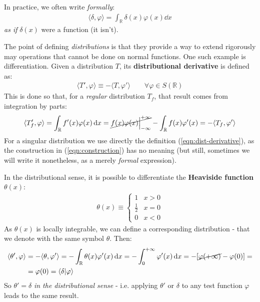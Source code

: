 \documentclass[../template.tex]{subfiles}
\begin{document}
In practice, we often write \textit{formally}:
\begin{align*}
    \langle \delta, \varphi \rangle = \int_{\mathbb{R}} \delta(x) \varphi(x) \dd{x}
\end{align*}
\textit{as if} $\delta(x)$ were a function (it isn't).   

\medskip

The point of defining \textit{distributions} is that they provide a way to extend rigorously may operations that cannot be done on normal functions.  One such example is differentiation. Given a distribution $T$, its \textbf{distributional derivative} is defined as:
\begin{align} \label{eqn:dist-derivative}
    \langle T', \varphi \rangle \equiv - \langle T, \varphi' \rangle \qquad \forall \varphi \in S(\mathbb{R})
\end{align}  
This is done so that, for a \textit{regular} distribution $T_f$, that result comes from integration by parts:
\begin{align} \label{eqn:construction}
    \langle T'_f, \varphi \rangle = \int_{\mathbb{R}} f'(x) \varphi(x) \dd{x} = \cancel{f(x) \varphi(x) \Big|_{-\infty}^{+\infty}} - \int_{\mathbb{R}} f(x) \varphi'(x) = - \langle T_f, \varphi' \rangle
\end{align} 
For a singular distribution we use directly the definition (\ref{eqn:dist-derivative}), as the construction in (\ref{eqn:construction}) has no meaning (but still, sometimes we will write it nonetheless, as a merely \textit{formal} expression).

\medskip

In the distributional sense, it is possible to differentiate the \textbf{Heaviside function} $\theta(x)$:
\begin{align*}
    \theta(x) \equiv \begin{cases}
        1 & x > 0\\
        \frac{1}{2} & x=0\\
        0 & x < 0 
    \end{cases}
\end{align*}
As $\theta(x)$ is locally integrable, we can define a corresponding distribution - that we denote with the same symbol $\theta$. Then:
\begin{align}\nonumber
    \langle \theta', \varphi \rangle &= - \langle \theta, \varphi' \rangle = -\int_{\mathbb{R}} \theta(x) \varphi'(x) \dd{x} = -\int_0^{+\infty} \varphi'(x) \dd{x} = -[\cancel{\varphi(+\infty)}-\varphi(0)] =\\
    &= \varphi(0) = \langle \delta | \varphi \rangle \label{eqn:theta-deriv}
\end{align}
So $\theta' = \delta$ \textit{in the distributional sense} - i.e. applying $\theta'$ or $\delta$ to any test function $\varphi$ leads to the same result.
\end{document}
